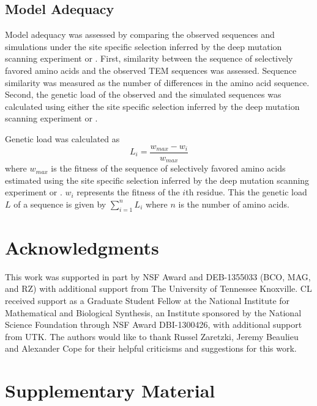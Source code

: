 \subsection{Model Adequacy}

Model adequacy was assessed by comparing the observed sequences and simulations under the site specific selection inferred by the deep mutation scanning experiment or \selac.
First, similarity between the sequence of selectively favored amino acids and the observed TEM sequences was assessed.
Sequence similarity was measured as the number of differences in the amino acid sequence.
Second, the genetic load of the observed and the simulated sequences was calculated using either the site specific selection inferred by the deep mutation scanning experiment or \selac.

Genetic load was calculated as
\begin{equation}
L_i = \frac{w_{max} - w_i}{w_{max}}
\end{equation}
where $w_{max}$ is the fitness of the sequence of selectively favored amino acids estimated using  the site specific selection inferred by the deep mutation scanning experiment or \selac.
$w_i$ represents the fitness of the $i$th residue.
This the genetic load $L$ of a sequence is given by $\sum_{i=1}^n L_i$ where $n$ is the number of amino acids.

\section{Acknowledgments}

This work was supported in part by NSF Award and DEB-1355033 (BCO, MAG, and RZ) with additional support from The University of Tennessee Knoxville. 
CL received support as a Graduate Student Fellow at the National Institute for Mathematical and Biological Synthesis, an Institute sponsored by the National Science Foundation through NSF Award DBI-1300426, with additional support from UTK. 
The authors would like to thank Russel Zaretzki, Jeremy Beaulieu and Alexander Cope for their helpful criticisms and suggestions for this work.




%
%

\clearpage
\section{Supplementary Material}

